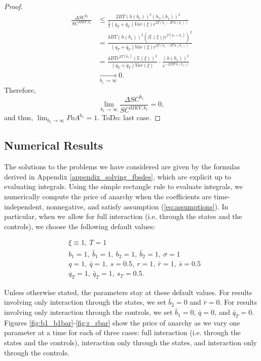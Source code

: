 \documentclass[11pt]{article}
\begin{document}
\begin{proof}
     
    \begin{equation*}
    \begin{split}
	    \frac{\Delta SC^{b_1}}{SC^{MKV,b_1}}&\leq \frac{2BT(h(b_1))^2 (h_{\bar{x}}(b_1))^2}{\frac{1}{2}(q_T+\bar{q}_T)Var(\xi)e^{2T(b_1-B^{\eta}h(b_1))}}\\
	    &= \frac{4BT(h(b_1))^2 (\left| \mathbb{E}(\xi)\right| e^{T(b_1+\bar{b}_1)})^2}{(q_T+\bar{q}_T)Var(\xi)e^{2T(b_1-B^{\eta}h(b_1))}}\\
	    &= \frac{4BTe^{2T(\bar{b}_1)}(\mathbb{E}(\xi))^2  }{(q_T+\bar{q}_T)Var(\xi)} \cdot \frac{(h(b_1))^2}{e^{-2TB^{\eta}h(b_1))}}\\
	    &\xrightarrow[b_1 \to \infty ]{} 0.
    \end{split}
    \end{equation*}
    Therefore,
    \begin{equation*}
	    \lim_{b_1 \to \infty}\frac{\Delta SC^{b_1}}{SC^{MKV,b_1}}=0,
    \end{equation*}
    and thus, $\lim_{b_1 \to \infty} PoA^{b_1}=1$. ToDo: last case.

\end{proof}


\subsection{\textbf{Numerical Results}}
The solutions to the problems we have considered are given by the formulas derived in Appendix \ref{appendix_solving_fbsdes}, which are explicit up to evaluating integrals. Using the simple rectangle rule to evaluate integrals, we numerically compute the price of anarchy when the coefficients are time-independent, nonnegative, and satisfy assumption (\ref{eq:assumptions}). In particular, when we allow for full interaction (i.e. through the states and the controls), we choose the following default values:

\begin{equation*}
\begin{split}
    &\xi\equiv 1,\ T=1 \\
    &b_1=1,\  \bar{b}_1=1,\ b_2=1,\ \bar{b}_2=1,\ \sigma=1 \\
    &q=1,\ \bar{q}=1,\ s=0.5,\ r=1,\ \bar{r}=1,\ \bar{s}=0.5 \\
    &q_T=1,\  \bar{q}_T=1,\ s_T=0.5.
\end{split}
\end{equation*}

Unless otherwise stated, the parameters stay at these default values. For results involving only interaction through the states, we set $\bar{b}_2=0$ and $\bar{r}=0$. For results involving only interaction through the controls, we set $\bar{b}_1=0$, $\bar{q}=0$, and $\bar{q}_T=0$. Figures \ref{fig:b1_b1bar}-\ref{fig:r_rbar} show the price of anarchy as we vary one parameter at a time for each of three cases: full interaction (i.e. through the states and the controls), interaction only through the states, and interaction only through the controls.
\end{document}

